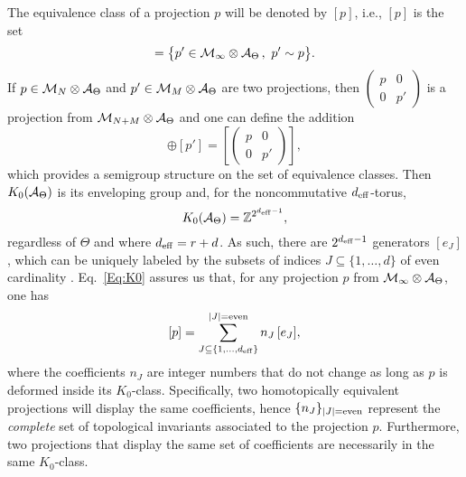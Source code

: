 \documentclass[
    aps,
    prb,
    twocolumn,
    floatfix,
    superscriptaddress,
	10pt
]{revtex4-2}
\begin{document}
The equivalence class of a projection $p$ will be denoted by $[p]$, i.e., $[p]$ is the set
\begin{equation}
[p]= \big \{p' \in \Mm_\infty \otimes \Aa_\Theta \, ,  \ p' \sim p \big \}.
\end{equation}
If $p \in {\mathcal M}_N \otimes {\mathcal A}_\Theta$ and $p' \in {\mathcal M}_M \otimes {\mathcal A}_\Theta$ are two projections, then $\begin{pmatrix} p & 0 \\ 0 & p' \end{pmatrix}$ is a projection from ${\mathcal M}_{N+M} \otimes {\mathcal A}_\Theta$ and one can define the addition
\begin{equation}
[p] \oplus [p'] = \left [  \left( \begin{matrix} p & 0 \\ 0 & p' \end{matrix} \right) \right ],
\end{equation}
which provides a semigroup structure on the set of equivalence classes. Then $K_0({\mathcal A}_\Theta)$ is its  enveloping group \cite{Blackadar1998} and, for the noncommutative ${d_\mathrm{eff}}$-torus,
\begin{equation}\label{Eq:K0} 
K_0({\mathcal A}_\Theta) = {\mathbb Z}^{2^{{d_\mathrm{eff}}-1}},
\end{equation}
regardless of $\Theta$ and where ${d_\mathrm{eff}} = r+d$.
As such, there are $2^{{d_\mathrm{eff}}-1}$ generators $[e_J]$, which can be uniquely labeled by the subsets of indices $J \subseteq \{1,\ldots,d\}$ of even cardinality \cite{Prodan2016}. Eq.~\eqref{Eq:K0} assures us that, for any projection $p$ from ${\mathcal M}_\infty \otimes {\mathcal A}_\Theta$, one has
\begin{equation}\label{Eq-GenExpansion}
[p]  = \sum_{J \subseteq \{1,\ldots,{d_\mathrm{eff}} \}}^{|J|={\rm even}} n_J \, [e_J], 
\end{equation} 
where the coefficients $n_J$ are integer numbers that do not change as long as $p$ is deformed inside its $K_0$-class. 
Specifically, two homotopically equivalent projections will display the same coefficients, hence $\{n_J\}_{|J|={\rm even}}$ represent the {\it complete} set of topological invariants associated to the projection $p$. 
Furthermore, two projections that display the same set of coefficients are necessarily in the same $K_0$-class. 

\end{document}
